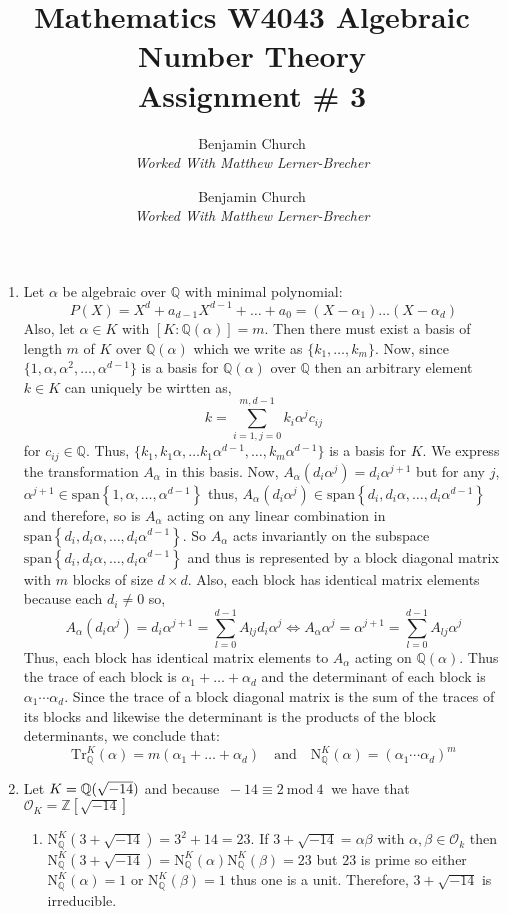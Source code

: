 \documentclass[12pt]{extarticle}
\author{Benjamin Church \\ \textit{Worked With Matthew Lerner-Brecher} }
\newcommand{\Z}{\mathbb{Z}}
\newcommand{\Q}{\mathbb{Q}}
\renewcommand{\mod}[3]{\: #1 \equiv #2 \: \mathrm{mod} \: #3 \:}
\newcommand{\quadfield}[1]{\Q \small(\sqrt{#1} \small)}
\newcommand{\vspan}[1]{\mathrm{span}\! \left\{#1 \right\}}
\newcommand{\ints}[1]{\mathcal{O}_{#1}}
\newcommand{\qnorm}[2]{\mathrm{N}^{#1}_{\Q}\left(#2\right)}
\newcommand{\atitle}[1]{\title{%
	\large \textbf{Mathematics W4043 Algebraic Number Theory
	\\ Assignment \# #1} \vspace{-2ex}}
\author{Benjamin Church \\ \textit{Worked With Matthew Lerner-Brecher} }
\maketitle}
\begin{document}
\atitle{3}
 
\begin{enumerate}
\item Let $\alpha$ be algebraic over $\Q$ with minimal polynomial:
\[P(X) = X^d + a_{d-1} X^{d-1} + \dots + a_0 = (X - \alpha_1) \dots (X - \alpha_d)\]
Also, let $\alpha \in K$ with $[K : \Q(\alpha)] = m$. Then there must exist a basis of length $m$ of $K$ over $\Q(\alpha)$ which we write as $\{k_1, \dots, k_m\}$. Now, since $\{1, \alpha, \alpha^2, \dots , \alpha^{d-1} \}$ is a basis for $\Q(\alpha)$ over $\Q$ then an arbitrary element $k \in K$ can uniquely be wirtten as,
\[k = \sum_{i = 1,j = 0}^{m, d-1} k_i \alpha^j c_{ij} \]
for $c_{ij} \in \Q$. Thus, $\{k_1 , k_1 \alpha, \dots k_1 \alpha^{d-1}, \dots , k_m \alpha^{d-1} \}$ is a basis for $K$. We express the transformation $A_\alpha$ in this basis. Now, $A_\alpha \left(d_i \alpha^j \right) = d_i \alpha^{j+1}$ but for any $j$, $\alpha^{j+1} \in \vspan{1, \alpha, \dots, \alpha^{d-1}}$ thus, $A_\alpha \left(d_i \alpha^j \right) \in \vspan{d_i, d_i \alpha, \dots, d_i \alpha^{d-1}}$ and therefore, so is $A_\alpha$ acting on any linear combination in $\vspan{d_i, d_i \alpha, \dots, d_i \alpha^{d-1}}$. So $A_\alpha$ acts invariantly on the subspace $\vspan{d_i, d_i \alpha, \dots, d_i \alpha^{d-1}}$ and thus is represented by a block diagonal matrix with $m$ blocks of size $d \times d$. Also, each block has identical matrix elements because each $d_i \neq 0$ so,
\[A_\alpha \left(d_i \alpha^j \right) = d_i \alpha^{j+1} = \sum_{l = 0}^{d-1} A_{lj} d_i \alpha^j \iff  A_\alpha \alpha^j = \alpha^{j+1} = \sum_{l = 0}^{d-1} A_{lj} \alpha^j\]
Thus, each block has identical matrix elements to $A_\alpha$ acting on $\Q(\alpha)$. Thus the trace of each block is $\alpha_1 + \dots + \alpha_d$ and the determinant of each block is $\alpha_1 \cdots \alpha_d$. Since the trace of a block diagonal matrix is the sum of the traces of its blocks and likewise the determinant is the products of the block determinants, we conclude that: \[\mathrm{Tr}_\Q^{K} (\alpha) = m(\alpha_1 + \dots + \alpha_d) \quad \text{and} \quad \qnorm{K}{\alpha} = (\alpha_1 \cdots \alpha_d)^m\]
\item Let $K = \quadfield{-14}$ and because $\mod{-14}{2}{4}$ we have that $\ints{K} = \Z[\sqrt{-14}]$
\begin{enumerate}
\item $\qnorm{K}{3 + \sqrt{-14}} = 3^2 + 14 = 23$. If $3 + \sqrt{-14} = \alpha \beta$ with $\alpha, \beta \in \ints{k}$ then $\qnorm{K}{3 + \sqrt{-14}} = \qnorm{K}{\alpha} \qnorm{K}{\beta} = 23$ but $23$ is prime so either $\qnorm{K}{\alpha} = 1$ or $\qnorm{K}{\beta} = 1$ thus one is a unit. Therefore, $3 + \sqrt{-14}$ is irreducible. 


\end{enumerate}
\end{enumerate}
\end{document}
